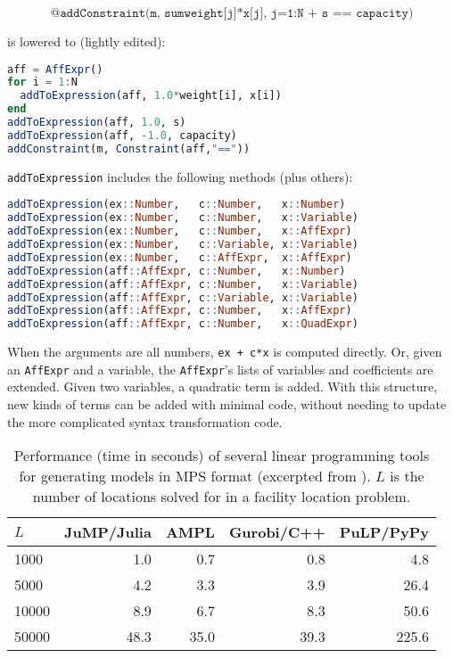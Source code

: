 \vspace{-3ex}
\[ \texttt{@addConstraint(m, sum{weight[j]*x[j], j=1:N} + s == capacity)} \]

\noindent
is lowered to (lightly edited):

\begin{singlespace}
\begin{lstlisting}[language=julia]
aff = AffExpr()
for i = 1:N
  addToExpression(aff, 1.0*weight[i], x[i])
end
addToExpression(aff, 1.0, s)
addToExpression(aff, -1.0, capacity)
addConstraint(m, Constraint(aff,"=="))
\end{lstlisting}
\end{singlespace}

\noindent
\texttt{addToExpression} includes the following methods (plus others):

\begin{singlespace}
\begin{lstlisting}[language=julia]
addToExpression(ex::Number,   c::Number,   x::Number)
addToExpression(ex::Number,   c::Number,   x::Variable)
addToExpression(ex::Number,   c::Number,   x::AffExpr)
addToExpression(ex::Number,   c::Variable, x::Variable)
addToExpression(ex::Number,   c::AffExpr,  x::AffExpr)
addToExpression(aff::AffExpr, c::Number,   x::Number)
addToExpression(aff::AffExpr, c::Number,   x::Variable)
addToExpression(aff::AffExpr, c::Variable, x::Variable)
addToExpression(aff::AffExpr, c::Number,   x::AffExpr)
addToExpression(aff::AffExpr, c::Number,   x::QuadExpr)
\end{lstlisting}
\end{singlespace}

When the arguments are all numbers, \texttt{ex + c*x} is computed directly.
Or, given an \texttt{AffExpr} and a variable, the \texttt{AffExpr}'s lists of
variables and coefficients are extended.
Given two variables, a quadratic term is added.
With this structure, new kinds of terms can be added with minimal code,
without needing to update the more complicated syntax transformation code.

\begin{table}[!t]
\begin{center}
\begin{tabular}{|l|r|r|r|r|}\hline
\textbf{$L$} & \textbf{JuMP/Julia} & \textbf{AMPL} & \textbf{Gurobi/C++} & \textbf{PuLP/PyPy} \\
\hline \hline
1000    & 1.0 & 0.7 & 0.8 & 4.8 \\
\hline
5000    & 4.2 & 3.3 & 3.9 & 26.4 \\
\hline
10000   & 8.9 & 6.7 & 8.3 & 50.6 \\
\hline
50000   & 48.3 & 35.0 & 39.3 & 225.6 \\
\hline
\end{tabular}
\end{center}
\caption[Performance of linear programming tools]{
\small{
Performance (time in seconds) of several linear programming tools for
generating models in MPS format (excerpted from \cite{LubinDunningIJOC}).
$L$ is the number of locations solved for in a facility location problem.
}
}
\label{jumpperf}
\end{table}

